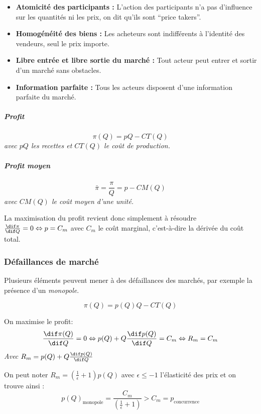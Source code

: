 \begin{itemize}[label =]
	\item \textbf{Atomicité des participants :} L'action des participants n'a pas d'influence sur les quantités ni les prix, on dit qu'ils sont ``price takers''.
	\item \textbf{Homogénéité des biens :} Les acheteurs sont indifférents à l'identité des vendeurs, seul le prix importe.
	\item \textbf{Libre entrée et libre sortie du marché :} Tout acteur peut entrer et sortir d'un marché sans obstacles.
	\item \textbf{Information parfaite :} Tous les acteurs disposent d'une information parfaite du marché.
\end{itemize}
\begin{tcolorbox}[title=Concurrence pure et parfaite]

\subparagraph{Profit} %
\label{subp:profit}

\[
	\pi(Q)= pQ-CT(Q)
\]
\emph{avec $pQ$ les recettes et $CT(Q)$ le coût de production.}

\subparagraph{Profit moyen} %
\label{subp:profit_moyen}
\[
	\bar{\pi}= \frac{\pi}{Q}= p - CM(Q)
\]
\emph{avec $CM(Q)$ le coût moyen d'une unité.}



La maximisation du profit revient donc simplement à résoudre $\frac{\dif \pi}{\dif Q}=0 \Leftrightarrow p=C_m$ avec $C_m$ le coût marginal, c'est-à-dire la dérivée du coût total.
\end{tcolorbox}


\subsubsection{Défaillances de marché} %
\label{sub:defaillances_de_marche}
Plusieurs éléments peuvent mener à des défaillances des marchés, 
par exemple la présence d'un \emph{monopole}.
\begin{tcolorbox}[title=Monopole]


\[
	\pi(Q)= p(Q)Q- CT(Q)
\]

On maximise le profit: 
\[
	\frac{\dif \pi(Q)}{\dif Q}=0 \Leftrightarrow p(Q)+ Q\frac{\dif p(Q)}{\dif Q}
  = C_m \Leftrightarrow R_m= C_m
\]
\emph{Avec $R_m=p(Q)+ Q\frac{\dif p(Q)}{\dif Q}$}

On peut noter $R_m= \left(\frac{1}{\epsilon}+1 \right)p(Q)$ avec $\epsilon \leq -1$ 
l'élasticité des prix et on trouve ainsi : 
\[
	p(Q)_{\text{monopole}}=\frac{C_m}{\left(\frac{1}{\epsilon}+1 \right)} > C_m=p_{\text{concurrence}}
\]
\end{tcolorbox}


